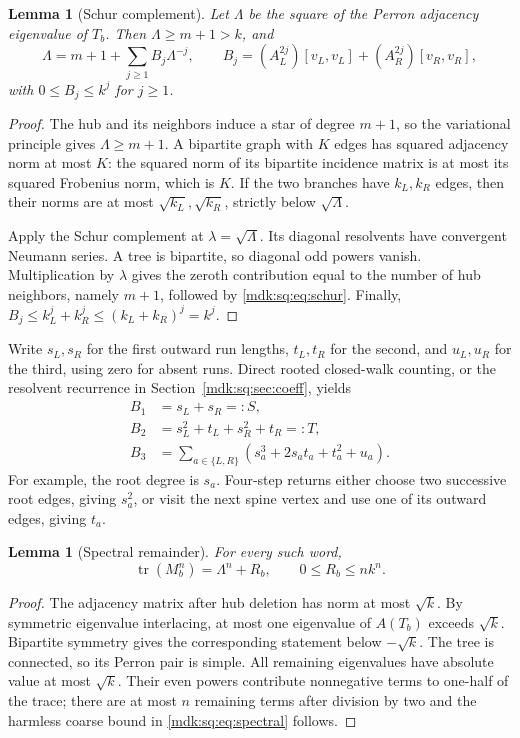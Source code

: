 \documentclass[11pt,letterpaper]{article}
\numberwithin{equation}{section}
\newtheorem{lemma}[theorem]{Lemma}
\theoremstyle{remark}\newtheorem{remark}[theorem]{Remark}
\DeclareMathOperator{\tr}{tr}\DeclareMathOperator{\TV}{TV}
\begin{document}
\begin{lemma}[Schur complement]\label{mdk:sq:lem:schur}
Let $\Lambda$ be the square of the Perron adjacency eigenvalue of $T_b$. Then $\Lambda\ge m+1>k$, and
\begin{equation}\label{mdk:sq:eq:schur}
\Lambda=m+1+\sum_{j\ge1}B_j\Lambda^{-j},\qquad
B_j=(A_L^{2j})[v_L,v_L]+(A_R^{2j})[v_R,v_R],
\end{equation}
with $0\le B_j\le k^j$ for $j\ge1$.
\end{lemma}
\begin{proof}
The hub and its neighbors induce a star of degree $m+1$, so the variational principle gives $\Lambda\ge m+1$. A bipartite graph with $K$ edges has squared adjacency norm at most $K$: the squared norm of its bipartite incidence matrix is at most its squared Frobenius norm, which is $K$. If the two branches have $k_L,k_R$ edges, then their norms are at most $\sqrt{k_L},\sqrt{k_R}$, strictly below $\sqrt\Lambda$.

Apply the Schur complement at $\lambda=\sqrt\Lambda$. Its diagonal resolvents have convergent Neumann series. A tree is bipartite, so diagonal odd powers vanish. Multiplication by $\lambda$ gives the zeroth contribution equal to the number of hub neighbors, namely $m+1$, followed by \eqref{mdk:sq:eq:schur}. Finally,
$B_j\le k_L^j+k_R^j\le(k_L+k_R)^j=k^j$.
\end{proof}

Write $s_L,s_R$ for the first outward run lengths, $t_L,t_R$ for the second, and $u_L,u_R$ for the third, using zero for absent runs. Direct rooted closed-walk counting, or the resolvent recurrence in Section~\ref{mdk:sq:sec:coeff}, yields
\begin{align}
B_1&=s_L+s_R=:S,\label{mdk:sq:eq:B1}\\
B_2&=s_L^2+t_L+s_R^2+t_R=:T,\label{mdk:sq:eq:B2}\\
B_3&=\sum_{a\in\{L,R\}}(s_a^3+2s_at_a+t_a^2+u_a).\label{mdk:sq:eq:B3}
\end{align}
For example, the root degree is $s_a$. Four-step returns either choose two successive root edges, giving $s_a^2$, or visit the next spine vertex and use one of its outward edges, giving $t_a$.

\begin{lemma}[Spectral remainder]\label{mdk:sq:lem:remainder}
For every such word,
\begin{equation}\label{mdk:sq:eq:spectral}
\tr(M_b^n)=\Lambda^n+R_b,\qquad 0\le R_b\le n k^n.
\end{equation}
\end{lemma}
\begin{proof}
The adjacency matrix after hub deletion has norm at most $\sqrt{k}$. By symmetric eigenvalue interlacing, at most one eigenvalue of $A(T_b)$ exceeds $\sqrt{k}$. Bipartite symmetry gives the corresponding statement below $-\sqrt{k}$. The tree is connected, so its Perron pair is simple. All remaining eigenvalues have absolute value at most $\sqrt{k}$. Their even powers contribute nonnegative terms to one-half of the trace; there are at most $n$ remaining terms after division by two and the harmless coarse bound in \eqref{mdk:sq:eq:spectral} follows.
\end{proof}
\end{document}
